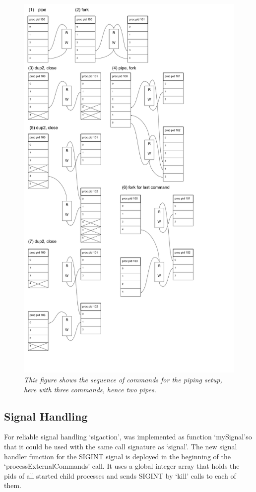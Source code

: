 \documentclass[a4paper,11pt,twoside]{article}
\begin{document}
\begin{figure}
\centering
\includegraphics[width=\textwidth]{pipes.png}
\caption{\textit{This figure shows the sequence of commands for the
    piping setup, here with three commands, hence two pipes.}}
\label{fig:pipes}
\end{figure}

\subsection{Signal Handling}
For reliable signal handling `sigaction', was implemented as function `mySignal'so that it could be used with the same call signature as `signal'. The new signal handler function for the SIGINT signal is deployed in the beginning of the `processExternalCommands' call. It uses a global integer array that holds the pids of all started child processes and sends SIGINT by `kill' calls to each of them.
\end{document}
